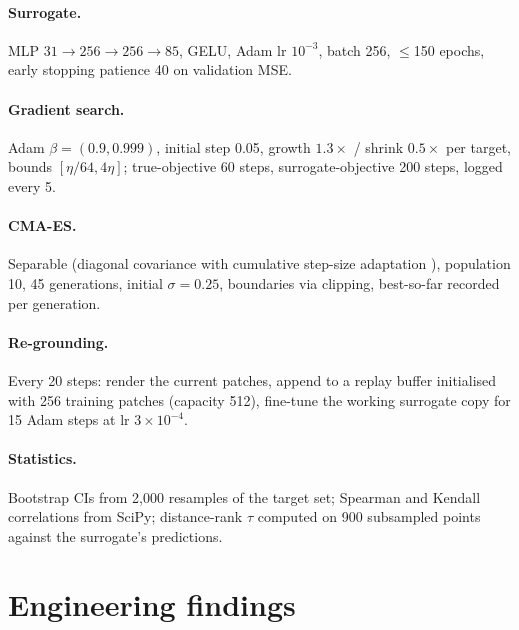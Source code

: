 \documentclass[11pt]{article}
\begin{document}
\paragraph{Surrogate.} MLP $31 \to 256 \to 256 \to 85$, GELU, Adam lr $10^{-3}$,
batch 256, $\le$150 epochs, early stopping patience 40 on validation MSE.

\paragraph{Gradient search.} Adam $\beta = (0.9, 0.999)$, initial step 0.05,
growth $1.3\times$ / shrink $0.5\times$ per target, bounds $[\eta/64, 4\eta]$;
true-objective 60 steps, surrogate-objective 200 steps, logged every 5.

\paragraph{CMA-ES.} Separable (diagonal covariance with cumulative step-size
adaptation \cite{sepcma}), population 10, 45 generations, initial
$\sigma = 0.25$, boundaries via clipping, best-so-far recorded per generation.

\paragraph{Re-grounding.} Every 20 steps: render the current patches, append to
a replay buffer initialised with 256 training patches (capacity 512), fine-tune
the working surrogate copy for 15 Adam steps at lr $3\times10^{-4}$.

\paragraph{Statistics.} Bootstrap CIs from 2{,}000 resamples of the target set;
Spearman and Kendall correlations from SciPy; distance-rank $\tau$ computed on
900 subsampled points against the surrogate's predictions.

\section{Engineering findings}\label{app:engineering}
\end{document}
